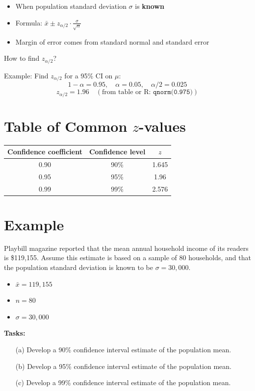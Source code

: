 \begin{itemize}
  \item When population standard deviation $\sigma$ is \textbf{known}
  \item Formula: $\bar{x} \pm z_{\alpha/2} \cdot \frac{\sigma}{\sqrt{n}}$
  \item Margin of error comes from standard normal and standard error
\end{itemize}

How to find $z_{\alpha/2}$?

Example: Find $z_{\alpha/2}$ for a 95\% CI on $\mu$:
\[
1 - \alpha = 0.95, \quad \alpha = 0.05, \quad \alpha/2 = 0.025
\]
\[
z_{\alpha/2} = 1.96 \quad (\text{from table or R: } \texttt{qnorm(0.975)})
\]


\section*{Table of Common $z$-values}

\begin{center}
\begin{tabular}{|c|c|c|}
\hline
Confidence coefficient & Confidence level & $z$ \\
\hline
0.90 & 90\% & 1.645 \\
0.95 & 95\% & 1.96 \\
0.99 & 99\% & 2.576 \\
\hline
\end{tabular}
\end{center}



\section*{Example}

Playbill magazine reported that the mean annual household income of its readers is \$119{,}155. Assume this estimate is based on a sample of 80 households, and that the population standard deviation is known to be $\sigma = 30{,}000$.

\begin{itemize}
  \item $\bar{x} = 119{,}155$
  \item $n = 80$
  \item $\sigma = 30{,}000$
\end{itemize}

\textbf{Tasks:}
\begin{enumerate}
  \item[(a)] Develop a 90\% confidence interval estimate of the population mean.
  \item[(b)] Develop a 95\% confidence interval estimate of the population mean.
  \item[(c)] Develop a 99\% confidence interval estimate of the population mean.
\end{enumerate}



